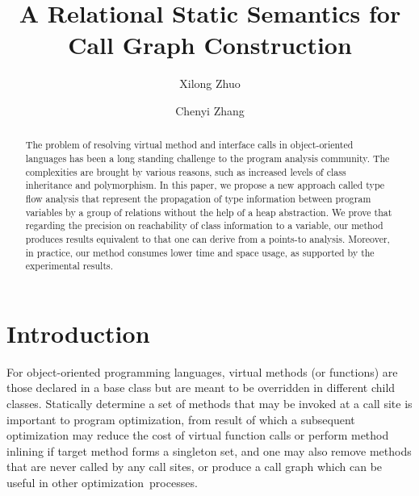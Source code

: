 \documentclass{llncs}
\begin{document}
%
\title{A Relational Static Semantics for Call Graph Construction}
%
%
\author{Xilong Zhuo \and Chenyi Zhang}
%
%
%

\maketitle              %
%
\begin{abstract}
The problem of resolving virtual method and interface calls in object-oriented languages has been a long standing challenge to the program analysis community. The complexities are brought by various reasons, such as increased levels of class inheritance and polymorphism. In this paper, we propose a new approach called type flow analysis that represent the propagation of type information between program variables by a group of relations without the help of a heap abstraction. We prove that regarding the precision on reachability of class information to a variable, our method produces results equivalent to that one can derive from a points-to analysis. Moreover, in practice, our method consumes lower time and space usage, as supported by the experimental results.

\end{abstract}
%
%
%

\section{Introduction}\label{sec:introduction}

For object-oriented programming languages, virtual methods (or functions) are those declared in a base class but are meant to be overridden in different child classes. Statically determine a set of methods that may be invoked at a call site is important to program optimization, from result of which a subsequent optimization may reduce the cost of virtual function calls or perform method inlining if target method forms a singleton set, and one may also remove methods that are never called by any call sites, or produce a call graph which can be useful in other optimization~processes.
\end{document}

